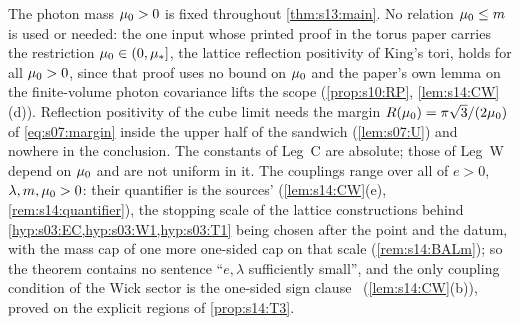 \begin{remark}\label{rem:s13:mu0}
The photon mass $\mu_0>0$ is fixed throughout \cref{thm:s13:main}. No relation $\mu_0\le m$ is used or needed: the one input whose printed proof in the torus paper \cite{SymPhase} carries the restriction $\mu_0\in(0,\mu_*]$, the lattice reflection positivity of King's tori, holds for all $\mu_0>0$, since that proof uses no bound on $\mu_0$ and the paper's own lemma on the finite-volume photon covariance lifts the scope (\cref{prop:s10:RP}, \cref{lem:s14:CW}(d)). Reflection positivity of the cube limit needs the margin $R(\mu_0)=\pi\sqrt3/(2\mu_0)$ of \eqref{eq:s07:margin} inside the upper half of the sandwich (\cref{lem:s07:U}) and nowhere in the conclusion. The constants of Leg~C are absolute; those of Leg~W depend on $\mu_0$ and are not uniform in it. The couplings range over all of $e>0$, $\lambda,m,\mu_0>0$: their quantifier is the sources' (\cref{lem:s14:CW}(e), \cref{rem:s14:quantifier}), the stopping scale of the lattice constructions behind \cref{hyp:s03:EC,hyp:s03:W1,hyp:s03:T1} being chosen after the point and the datum, with the mass cap of \cite[Prop.~3.1]{Ba2} one more one-sided cap on that scale (\cref{rem:s14:BALm}); so the theorem contains no sentence ``$e,\lambda$ sufficiently small'', and the only coupling condition of the Wick sector is the one-sided sign clause \Tthree\ (\cref{lem:s14:CW}(b)), proved on the explicit regions of \cref{prop:s14:T3}.
\end{remark}

